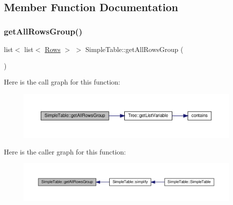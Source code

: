 \subsection{Member Function Documentation}
\mbox{\label{class_simple_table_a34c3e2eb7dcd3c05e22ea56f719913e2}} 
\subsubsection{\texorpdfstring{get\+All\+Rows\+Group()}{getAllRowsGroup()}}
{\footnotesize\ttfamily list$<$ list$<$ \hyperlink{class_rows}{Rows} $>$ $>$ Simple\+Table\+::get\+All\+Rows\+Group (\begin{DoxyParamCaption}{ }\end{DoxyParamCaption})\hspace{0.3cm}{\ttfamily [private]}}

Here is the call graph for this function\+:\nopagebreak
\begin{figure}[H]
\begin{center}
\leavevmode
\includegraphics[width=350pt]{d0/d52/class_simple_table_a34c3e2eb7dcd3c05e22ea56f719913e2_cgraph}
\end{center}
\end{figure}
Here is the caller graph for this function\+:\nopagebreak
\begin{figure}[H]
\begin{center}
\leavevmode
\includegraphics[width=350pt]{d0/d52/class_simple_table_a34c3e2eb7dcd3c05e22ea56f719913e2_icgraph}
\end{center}
\end{figure}
\mbox{\label{class_simple_table_a4d4e552c725f1306708a5918365f7d26}} 
